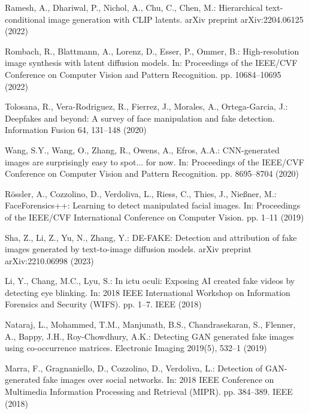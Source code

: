 \documentclass[runningheads]{llncs}
\begin{document}

\begin{thebibliography}{10}

Ramesh, A., Dhariwal, P., Nichol, A., Chu, C., Chen, M.:
Hierarchical text-conditional image generation with CLIP latents.
arXiv preprint arXiv:2204.06125 (2022)

Rombach, R., Blattmann, A., Lorenz, D., Esser, P., Ommer, B.:
High-resolution image synthesis with latent diffusion models.
In: Proceedings of the IEEE/CVF Conference on Computer Vision and Pattern Recognition. pp. 10684--10695 (2022)

Tolosana, R., Vera-Rodriguez, R., Fierrez, J., Morales, A., Ortega-Garcia, J.:
Deepfakes and beyond: A survey of face manipulation and fake detection.
Information Fusion 64, 131--148 (2020)

Wang, S.Y., Wang, O., Zhang, R., Owens, A., Efros, A.A.:
CNN-generated images are surprisingly easy to spot... for now.
In: Proceedings of the IEEE/CVF Conference on Computer Vision and Pattern Recognition. pp. 8695--8704 (2020)

Rössler, A., Cozzolino, D., Verdoliva, L., Riess, C., Thies, J., Nießner, M.:
FaceForensics++: Learning to detect manipulated facial images.
In: Proceedings of the IEEE/CVF International Conference on Computer Vision. pp. 1--11 (2019)

Sha, Z., Li, Z., Yu, N., Zhang, Y.:
DE-FAKE: Detection and attribution of fake images generated by text-to-image diffusion models.
arXiv preprint arXiv:2210.06998 (2023)

Li, Y., Chang, M.C., Lyu, S.:
In ictu oculi: Exposing AI created fake videos by detecting eye blinking.
In: 2018 IEEE International Workshop on Information Forensics and Security (WIFS). pp. 1--7. IEEE (2018)

Nataraj, L., Mohammed, T.M., Manjunath, B.S., Chandrasekaran, S., Flenner, A., Bappy, J.H., Roy-Chowdhury, A.K.:
Detecting GAN generated fake images using co-occurrence matrices.
Electronic Imaging 2019(5), 532--1 (2019)

Marra, F., Gragnaniello, D., Cozzolino, D., Verdoliva, L.:
Detection of GAN-generated fake images over social networks.
In: 2018 IEEE Conference on Multimedia Information Processing and Retrieval (MIPR). pp. 384--389. IEEE (2018)

\end{thebibliography}
\end{document}
